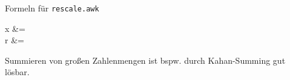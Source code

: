 			Formeln für \texttt{rescale.awk}
			\begin{flalign*}
				x &= \\
				r &= 
			\end{flalign*}

			Summieren von großen Zahlenmengen ist bspw. durch Kahan-Summing gut lösbar.

		
	

